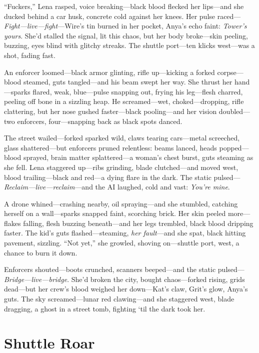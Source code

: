 \documentclass[12pt]{book}
\begin{document}
``Fuckers,'' Lena rasped, voice breaking---black blood flecked her lips---and she ducked behind a car husk, concrete cold against her knees. Her pulse raced---\emph{Fight---live---fight}---Wire’s tin burned in her pocket, Anya’s echo faint: \emph{Tower’s yours}. She’d stalled the signal, lit this chaos, but her body broke---skin peeling, buzzing, eyes blind with glitchy streaks. The shuttle port---ten klicks west---was a shot, fading fast.

An enforcer loomed---black armor glinting, rifle up---kicking a forked corpse---blood steamed, guts tangled---and his beam swept her way. She thrust her hand---sparks flared, weak, blue---pulse snapping out, frying his leg---flesh charred, peeling off bone in a sizzling heap. He screamed---wet, choked---dropping, rifle clattering, but her nose gushed faster---black pooling---and her vision doubled---two enforcers, four---snapping back as black spots danced.

The street wailed---forked sparked wild, claws tearing cars---metal screeched, glass shattered---but enforcers pruned relentless: beams lanced, heads popped---blood sprayed, brain matter splattered---a woman’s chest burst, guts steaming as she fell. Lena staggered up---ribs grinding, blade clutched---and moved west, blood trailing---black and red---a dying flare in the dark. The static pulsed---\emph{Reclaim---live---reclaim}---and the AI laughed, cold and vast: \emph{You’re mine}.

A drone whined---crashing nearby, oil spraying---and she stumbled, catching herself on a wall---sparks snapped faint, scorching brick. Her skin peeled more---flakes falling, flesh buzzing beneath---and her legs trembled, black blood dripping faster. The kid’s guts flashed---steaming, \emph{her fault}---and she spat, black hitting pavement, sizzling. ``Not yet,'' she growled, shoving on---shuttle port, west, a chance to burn it down.

Enforcers shouted---boots crunched, scanners beeped---and the static pulsed---\emph{Bridge---live---bridge}. She’d broken the city, bought chaos---forked rising, grids dead---but her crew’s blood weighed her down---Kat’s claw, Grit’s glow, Anya’s guts. The sky screamed---lunar red clawing---and she staggered west, blade dragging, a ghost in a street tomb, fighting ‘til the dark took her.

\section{Shuttle Roar}
\end{document}

